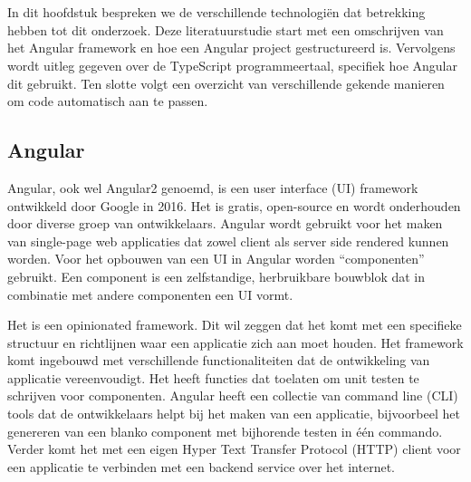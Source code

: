 \chapter{}%
\label{ch:stand-van-zaken}

In dit hoofdstuk bespreken we de verschillende technologiën dat betrekking hebben tot dit onderzoek.
Deze literatuurstudie start met een omschrijven van het Angular framework en hoe een Angular project gestructureerd is.
Vervolgens wordt uitleg gegeven over de TypeScript programmeertaal, specifiek hoe Angular dit gebruikt.
Ten slotte volgt een overzicht van verschillende gekende manieren om code automatisch aan te passen.

\section{Angular}
\label{ch:stand-van-zaken:angular}

Angular, ook wel Angular2 genoemd, is een user interface (UI) framework ontwikkeld door Google in 2016. %
Het is gratis, open-source en wordt onderhouden door diverse groep van ontwikkelaars.
Angular wordt gebruikt voor het maken van single-page web applicaties dat zowel client als server side rendered kunnen worden.
Voor het opbouwen van een UI in Angular worden ``componenten'' gebruikt.
Een component is een zelfstandige, herbruikbare bouwblok dat in combinatie met andere componenten een UI vormt. %

Het is een opinionated framework.
Dit wil zeggen dat het komt met een specifieke structuur en richtlijnen waar een applicatie zich aan moet houden. %
Het framework komt ingebouwd met verschillende functionaliteiten dat de ontwikkeling van applicatie vereenvoudigt. %
Het heeft functies dat toelaten om unit testen te schrijven voor componenten.
Angular heeft een collectie van command line (CLI) tools dat de ontwikkelaars helpt bij het maken van een applicatie, bijvoorbeel het genereren van een blanko component met bijhorende testen in één commando.
Verder komt het met een eigen Hyper Text Transfer Protocol (HTTP) client voor een applicatie te verbinden met een backend service over het internet.

